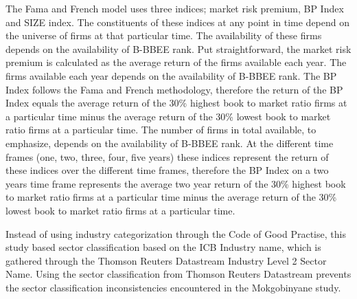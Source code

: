 The Fama and French model uses three indices; market risk premium, BP Index and SIZE index. The constituents of these indices at any point in time depend on the universe of firms at that particular time. The availability of these firms depends on the availability of B-BBEE rank. Put straightforward, the  market risk premium is calculated as the average return of the firms available each year. The firms available each year depends on the availability of B-BBEE rank. The BP Index follows the Fama and French methodology, therefore the return of the BP Index equals the average return of the 30\% highest book to market ratio firms at a particular time minus the average return of the 30\% lowest book to market ratio firms at a particular time. The number of firms in total available, to emphasize, depends on the availability of B-BBEE rank. At the different time frames (one, two, three, four, five years) these indices represent the return of these indices over the different time frames, therefore the BP Index on a two years time frame represents the average two year return of the 30\% highest book to market ratio firms at a particular time minus the average return of the 30\% lowest book to market ratio firms at a particular time.

Instead of using industry categorization through the Code of Good Practise, this study based sector classification based on the ICB Industry name, which is gathered through the Thomson Reuters Datastream Industry Level 2 Sector Name. Using the sector classification from Thomson Reuters Datastream prevents the sector classification inconsistencies encountered in the Mokgobinyane study.
